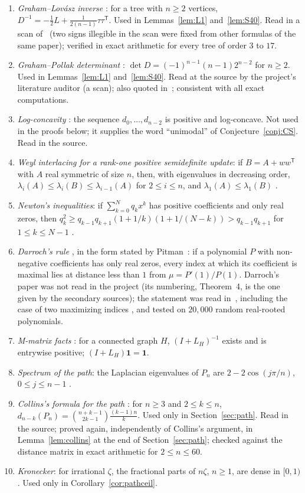 \documentclass[11pt]{amsart}
\theoremstyle{definition}
\theoremstyle{remark}
\newcommand{\one}{\mathbf 1}
\newcommand{\T}{\mathsf T}
\begin{document}
\begin{enumerate}
\item[(GL)] \emph{Graham--Lov\'asz inverse} \cite[Lemma~1, p.~66]{GL78}: for
a tree with $n\ge2$ vertices, $D^{-1}=-\frac12L+\frac{1}{2(n-1)}\tau\tau^\T$.
Used in Lemmas~\ref{lem:L1} and~\ref{lem:S40}. Read in a scan of~\cite{GL78}
(two signs illegible in the scan were fixed from other formulas of the same
paper); verified in exact arithmetic for every tree of order $3$ to $17$.
\item[(GP)] \emph{Graham--Pollak determinant} \cite[proof of Theorem~3,
pp.~2509--2511]{GP71}: $\det D=(-1)^{n-1}(n-1)2^{n-2}$ for $n\ge2$. Used in
Lemmas~\ref{lem:L1} and~\ref{lem:S40}. Read at the source by the project's
literature auditor (a scan); also quoted in~\cite{AAB}; consistent with all
exact computations.
\item[(LC)] \emph{Log-concavity} \cite[Theorem~2.1]{AAB}: the sequence
$d_0,\dots,d_{n-2}$ is positive and log-concave. Not used in the proofs below;
it supplies the word ``unimodal'' of Conjecture~\ref{conj:CS}. Read in the
source.
\item[(W)] \emph{Weyl interlacing for a rank-one positive semidefinite
update}: if $B=A+ww^\T$ with $A$ real symmetric of size $n$, then, with
eigenvalues in decreasing order, $\lambda_i(A)\le\lambda_i(B)\le\lambda_{i-1}(A)$
for $2\le i\le n$, and $\lambda_1(A)\le\lambda_1(B)$ \cite{HJ}.
\item[(N)] \emph{Newton's inequalities}: if $\sum_{k=0}^Nq_kx^k$ has positive
coefficients and only real zeros, then
$q_k^2\ge q_{k-1}q_{k+1}(1+1/k)(1+1/(N-k))>q_{k-1}q_{k+1}$ for $1\le k\le N-1$
\cite{HLP}.
\item[(D)] \emph{Darroch's rule} \cite[Theorem~4]{Dar64}, in the form stated
by Pitman~\cite[p.~284]{Pit97}: if a polynomial $P$ with non-negative
coefficients has only real zeros, every index at which its coefficient is
maximal lies at distance less than $1$ from $\mu=P'(1)/P(1)$. Darroch's paper
was not read in the project (its numbering, Theorem~4, is the one given by
the secondary sources); the statement was read in~\cite{Pit97},
including the case of two maximizing indices \cite[eq.~(13)]{Pit97}, and
tested on $20{,}000$ random real-rooted polynomials.
\item[(M)] \emph{M-matrix facts} \cite{BP}: for a connected graph $H$,
$(I+L_H)^{-1}$ exists and is entrywise positive; $(I+L_H)\one=\one$.
\item[(PS)] \emph{Spectrum of the path}: the Laplacian eigenvalues of $P_n$
are $2-2\cos(j\pi/n)$, $0\le j\le n-1$ \cite{BH}.
\item[(C)] \emph{Collins's formula for the path} \cite[Theorem~3 and its
proof, p.~31]{Col89}: for $n\ge3$ and $2\le k\le n$,
$d_{n-k}(P_n)=\binom{n+k-1}{2k-1}\frac{(k-1)n}{k}$. Used only in
Section~\ref{sec:path}. Read in the source; proved again, independently of
Collins's argument, in Lemma~\ref{lem:collins} at the end of
Section~\ref{sec:path}; checked against the distance matrix in exact
arithmetic for $2\le n\le60$.
\item[(Kr)] \emph{Kronecker}: for irrational $\zeta$, the fractional parts of
$n\zeta$, $n\ge1$, are dense in $[0,1)$. Used only in
Corollary~\ref{cor:pathceil}.
\end{enumerate}
\end{document}
